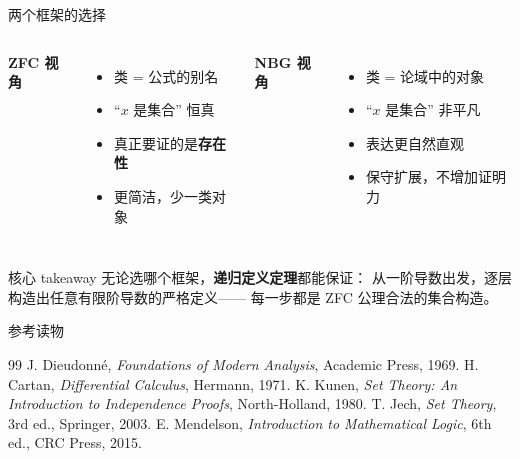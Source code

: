 \documentclass[10pt,aspectratio=169]{beamer}
\begin{document}
\begin{frame}{两个框架的选择}
  \begin{columns}[T]
    \textbf{ZFC 视角}
    \begin{itemize}
      \item 类 = 公式的别名
      \item ``$x$ 是集合'' 恒真
      \item 真正要证的是\textbf{存在性}
      \item 更简洁，少一类对象
    \end{itemize}

    \textbf{NBG 视角}
    \begin{itemize}
      \item 类 = 论域中的对象
      \item ``$x$ 是集合'' 非平凡
      \item 表达更自然直观
      \item 保守扩展，不增加证明力
    \end{itemize}
  \end{columns}

  \medskip
  \begin{block}{核心 takeaway}
    无论选哪个框架，\textbf{递归定义定理}都能保证：
    从一阶导数出发，逐层构造出任意有限阶导数的严格定义——
    每一步都是 ZFC 公理合法的集合构造。
  \end{block}
\end{frame}

\begin{frame}{参考读物}
  \begin{thebibliography}{99}
     J. Dieudonné, \emph{Foundations of Modern Analysis}, Academic Press, 1969.
     H. Cartan, \emph{Differential Calculus}, Hermann, 1971.
     K. Kunen, \emph{Set Theory: An Introduction to Independence Proofs}, North-Holland, 1980.
     T. Jech, \emph{Set Theory}, 3rd ed., Springer, 2003.
     E. Mendelson, \emph{Introduction to Mathematical Logic}, 6th ed., CRC Press, 2015.
  \end{thebibliography}
\end{frame}
\end{document}
